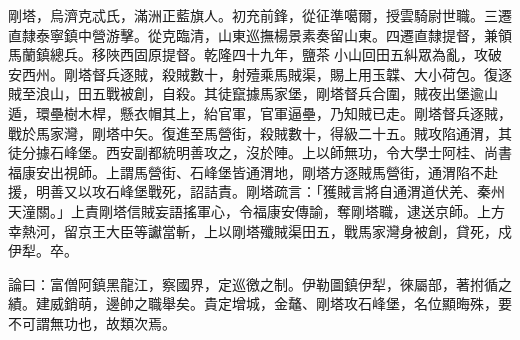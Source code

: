 \begin{pinyinscope}
剛塔，烏濟克忒氏，滿洲正藍旗人。初充前鋒，從征準噶爾，授雲騎尉世職。三遷直隸泰寧鎮中營游擊。從克臨清，山東巡撫楊景素奏留山東。四遷直隸提督，兼領馬蘭鎮總兵。移陜西固原提督。乾隆四十九年，鹽茶小山回田五糾眾為亂，攻破安西州。剛塔督兵逐賊，殺賊數十，射殪乘馬賊渠，賜上用玉韘、大小荷包。復逐賊至浪山，田五戰被創，自殺。其徒竄據馬家堡，剛塔督兵合圍，賊夜出堡逾山遁，環壘樹木桿，懸衣帽其上，紿官軍，官軍逼壘，乃知賊已走。剛塔督兵逐賊，戰於馬家灣，剛塔中矢。復進至馬營街，殺賊數十，得級二十五。賊攻陷通渭，其徒分據石峰堡。西安副都統明善攻之，沒於陣。上以師無功，令大學士阿桂、尚書福康安出視師。上謂馬營街、石峰堡皆通渭地，剛塔方逐賊馬營街，通渭陷不赴援，明善又以攻石峰堡戰死，詔詰責。剛塔疏言：「獲賊言將自通渭道伏羌、秦州天潼關。」上責剛塔信賊妄語搖軍心，令福康安傳諭，奪剛塔職，逮送京師。上方幸熱河，留京王大臣等讞當斬，上以剛塔殲賊渠田五，戰馬家灣身被創，貸死，戍伊犁。卒。

論曰：富僧阿鎮黑龍江，察國界，定巡徼之制。伊勒圖鎮伊犁，徠屬部，著拊循之績。建威銷萌，邊帥之職舉矣。貴定增城，金鼇、剛塔攻石峰堡，名位顯晦殊，要不可謂無功也，故類次焉。


\end{pinyinscope}